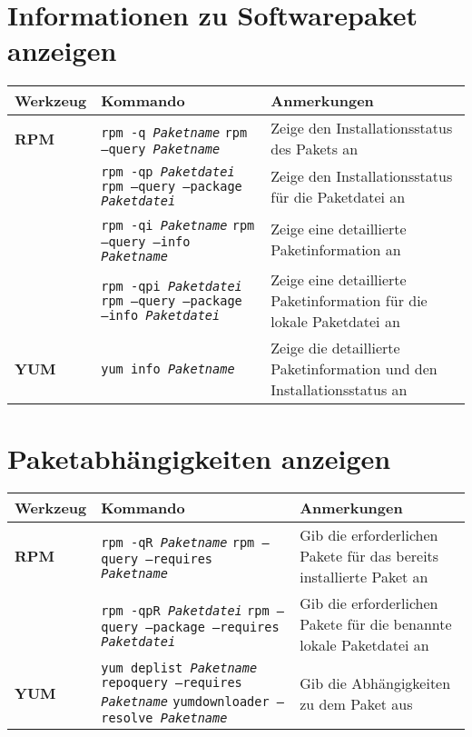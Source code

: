 \documentclass[10pt,a4paper]{article}
\begin{document}
\section{Informationen zu Softwarepaket anzeigen}
\begin{tabular}{ p{3.5cm} p{9cm} p{11cm}}
  \hline
  \rowcolor{Gray}
  \textbf{Werkzeug} & \textbf{Kommando} & \textbf{Anmerkungen} \\
  \hline 
  \textbf{RPM} & \texttt{rpm -q \textit{Paketname}} \newline \texttt{rpm --query \textit{Paketname}} & Zeige den Installationsstatus des Pakets an\\
  \rowcolor{Gray}
  & \texttt{rpm -qp \textit{Paketdatei}} \newline \texttt{rpm --query --package \textit{Paketdatei}}& Zeige den Installationsstatus für die Paketdatei an\\
  & \texttt{rpm -qi \textit{Paketname}} \newline \texttt{rpm --query --info \textit{Paketname}} &  Zeige eine detaillierte Paketinformation an\\
  \rowcolor{Gray}
  & \texttt{rpm -qpi \textit{Paketdatei}} \newline \texttt{rpm --query --package --info \textit{Paketdatei}} &  Zeige eine detaillierte Paketinformation für die lokale Paketdatei an\\
  \textbf{YUM} & \texttt{yum info \textit{Paketname}} &  Zeige die detaillierte Paketinformation und den Installationsstatus an\\
  \hline
\end{tabular}

\section{Paketabhängigkeiten anzeigen}
\begin{tabular}{ p{3.5cm} p{9cm} p{11cm}}
  \hline
  \rowcolor{Gray}
  \textbf{Werkzeug} & \textbf{Kommando} & \textbf{Anmerkungen} \\
  \hline 
  \textbf{RPM} & \texttt{rpm -qR \textit{Paketname}} \newline \texttt{rpm --query --requires \textit{Paketname}} & Gib die erforderlichen Pakete für das bereits installierte Paket an \\
  \rowcolor{Gray}
  & \texttt{rpm -qpR \textit{Paketdatei}} \newline \texttt{rpm --query --package --requires \textit{Paketdatei}} & Gib die erforderlichen Pakete für die benannte lokale Paketdatei an\\
  \textbf{YUM} & \texttt{yum deplist \textit{Paketname}} \newline \texttt{repoquery --requires \textit{Paketname}} \newline \texttt{yumdownloader --resolve \textit{Paketname}} & Gib die Abhängigkeiten zu dem Paket aus \\
  \hline
\end{tabular}
\end{document}
